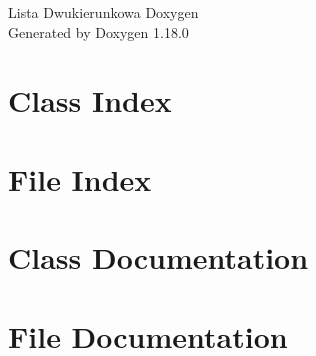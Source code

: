\documentclass[twoside]{book}
\newcommand{\+}{\discretionary{\mbox{\scriptsize$\hookleftarrow$}}{}{}}
\newcommand{\clearemptydoublepage}{%
    \newpage{\pagestyle{empty}\cleardoublepage}%
  }
\begin{document}
  \raggedbottom
    \hypersetup{pageanchor=false,
                bookmarksnumbered=true,
                pdfencoding=unicode
               }
  \begin{titlepage}
  \vspace*{7cm}
  \begin{center}%
  {\Large Lista Dwukierunkowa Doxygen}\\
  \vspace*{1cm}
  {\large Generated by Doxygen 1.18.0}\\
  \end{center}
  \end{titlepage}
  \clearemptydoublepage
  \tableofcontents
  \clearemptydoublepage
  \hypersetup{pageanchor=true}
\chapter{Class Index}

\chapter{File Index}

\chapter{Class Documentation}




\chapter{File Documentation}












  \backmatter
  \newpage
  \clearemptydoublepage
  \printindex
\end{document}
